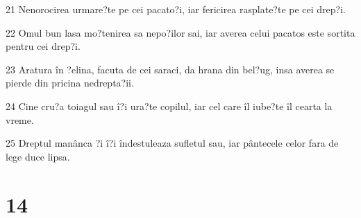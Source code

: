 \par 21 Nenorocirea urmare?te pe cei pacato?i, iar fericirea rasplate?te pe cei drep?i.
\par 22 Omul bun lasa mo?tenirea sa nepo?ilor sai, iar averea celui pacatos este sortita pentru cei drep?i.
\par 23 Aratura în ?elina, facuta de cei saraci, da hrana din bel?ug, insa averea se pierde din pricina nedrepta?ii.
\par 24 Cine cru?a toiagul sau î?i ura?te copilul, iar cel care îl iube?te îl cearta la vreme.
\par 25 Dreptul manânca ?i î?i îndestuleaza sufletul sau, iar pântecele celor fara de lege duce lipsa.

\chapter{14}

